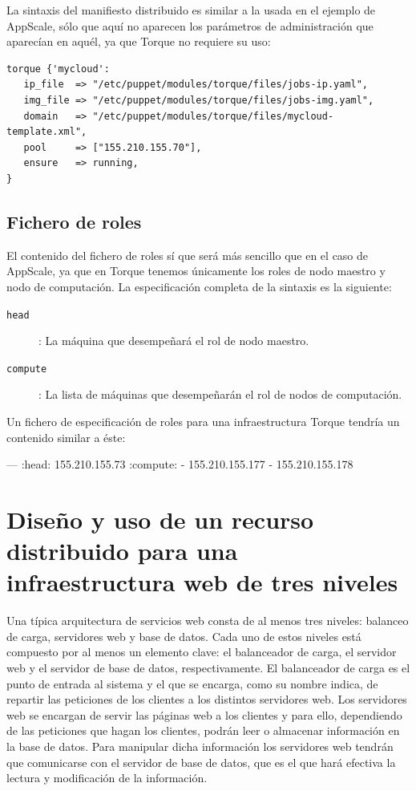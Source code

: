 La sintaxis del manifiesto distribuido es similar a la usada en el ejemplo de AppScale, sólo que aquí no aparecen los parámetros de administración que aparecían en aquél, ya que Torque no requiere su uso:

\begin{lstlisting}
torque {'mycloud':
   ip_file  => "/etc/puppet/modules/torque/files/jobs-ip.yaml",
   img_file => "/etc/puppet/modules/torque/files/jobs-img.yaml",
   domain   => "/etc/puppet/modules/torque/files/mycloud-template.xml",
   pool     => ["155.210.155.70"],
   ensure   => running,
}
\end{lstlisting}

\subsection{Fichero de roles}

El contenido del fichero de roles sí que será más sencillo que en el caso de AppScale, ya que en Torque tenemos únicamente los roles de nodo maestro y nodo de computación. La especificación completa de la sintaxis es la siguiente:

\begin{description}
\item[\texttt{head}]: La máquina que desempeñará el rol de nodo maestro.
\item[\texttt{compute}]: La lista de máquinas que desempeñarán el rol de nodos de computación.
\end{description}

Un fichero de especificación de roles para una infraestructura Torque tendría un contenido similar a éste:
\begin{yamlcode}
--- 
:head: 155.210.155.73
:compute:
- 155.210.155.177
- 155.210.155.178
\end{yamlcode}


\section{Diseño y uso de un recurso distribuido para una infraestructura web de tres niveles}

Una típica arquitectura de servicios web consta de al menos tres niveles: balanceo de carga, servidores web y base de datos. Cada uno de estos niveles está compuesto por al menos un elemento clave: el balanceador de carga, el servidor web y el servidor de base de datos, respectivamente. El balanceador de carga es el punto de entrada al sistema y el que se encarga, como su nombre indica, de repartir las peticiones de los clientes a los distintos servidores web. Los servidores web se encargan de servir las páginas web a los clientes y para ello, dependiendo de las peticiones que hagan los clientes, podrán leer o almacenar información en la base de datos. Para manipular dicha información los servidores web tendrán que comunicarse con el servidor de base de datos, que es el que hará efectiva la lectura y modificación de la información.\\

